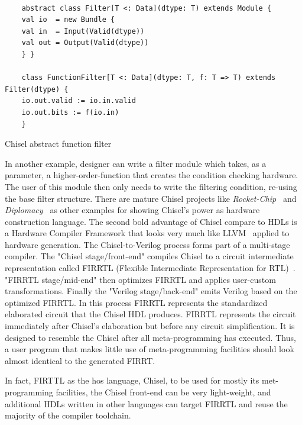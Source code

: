 \begin{listing}[ht]
    \begin{verbatim}

    abstract class Filter[T <: Data](dtype: T) extends Module {
    val io  = new Bundle {
    val in  = Input(Valid(dtype))
    val out = Output(Valid(dtype))
    } }

    class FunctionFilter[T <: Data](dtype: T, f: T => T) extends Filter(dtype) {
    io.out.valid := io.in.valid
    io.out.bits := f(io.in)
    }

    \end{verbatim}
    \caption{Chisel abstract function filter}
    \label{listing:genesis2}
\end{listing}




In another example, designer can write a filter module which takes, as a parameter, a higher-order-function that creates the condition checking hardware.
The user of this module then only needs to write the filtering condition, re-using the base filter structure.
There are mature Chisel projects like \emph{Rocket-Chip~\cite{rocket-chip}} and \emph{Diplomacy~\cite{diplomacy}} as other examples for showing Chisel's power as hardware construction language.
The second bold advantage of Chisel compare to HDLs is a Hardware Compiler Framework that looks very much like LLVM~\cite{llvm} applied to hardware generation.
The Chisel-to-Verilog process forms part of a multi-stage compiler.
The "Chisel stage/front-end" compiles Chisel to a circuit intermediate representation called FIRRTL (Flexible Intermediate Representation for RTL)~\cite{firrtl}.
"FIRRTL stage/mid-end" then optimizes FIRRTL and applies user-custom transformations. Finally the "Verilog stage/back-end" emits Verilog based on the optimized FIRRTL.
In this process FIRRTL represents the standardized elaborated circuit that the Chisel HDL produces.
FIRRTL represents the circuit immediately after Chisel's elaboration but before any circuit simplification.
It is designed to resemble the Chisel after all meta-programming has executed. Thus, a user program that makes little use of meta-programming facilities should look almost identical to the generated FIRRT.

In fact, FIRTTL as the hos language, Chisel, to be used for mostly its met-programming facilities, the Chisel front-end can be very light-weight, and additional HDLs written in other languages can target FIRRTL and reuse the majority of the compiler toolchain.


